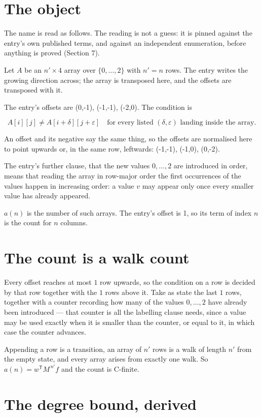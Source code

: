 \documentclass[11pt]{article}
\theoremstyle{definition}
\begin{document}
\section{The object}

The name is read as follows. The reading is not a guess: it is pinned against the entry's own published terms, and against an independent enumeration, before anything is proved (Section 7).

Let $A$ be an $n' \times 4$ array over $\{0,\dots,2\}$ with $n' = n$ rows. The entry writes the growing direction across; the array is transposed here, and the offsets are transposed with it.

The entry's offsets are (0,-1), (-1,-1), (-2,0). The condition is

\[A[i][j] \ne A[i{+}\delta][j{+}\varepsilon]\quad\text{for every listed }(\delta,\varepsilon)\text{ landing inside the array.}\]

An offset and its negative say the same thing, so the offsets are normalised here to point upwards or, in the same row, leftwards: (-1,-1), (-1,0), (0,-2).

The entry's further clause, that the new values $0,\dots,2$ are introduced in order, means that reading the array in row-major order the first occurrences of the values happen in increasing order: a value $v$ may appear only once every smaller value has already appeared.

$a(n)$ is the number of such arrays. The entry's offset is 1, so its term of index $n$ is the count for $n$ columns.

\section{The count is a walk count}

Every offset reaches at most $1$ row upwards, so the condition on a row is decided by that row together with the $1$ rows above it. Take as state the last $1$ rows, together with a counter recording how many of the values $0,\dots,2$ have already been introduced --- that counter is all the labelling clause needs, since a value may be used exactly when it is smaller than the counter, or equal to it, in which case the counter advances.

Appending a row is a transition, an array of $n'$ rows is a walk of length $n'$ from the empty state, and every array arises from exactly one walk. So $a(n) = w^{\mathsf T}M^{\,n'}f$ and the count is C-finite.

\section{The degree bound, derived}
\end{document}
